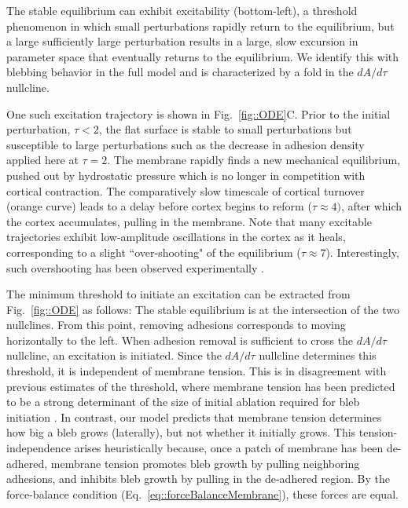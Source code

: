 The stable equilibrium can exhibit excitability (bottom-left), a threshold phenomenon in which small perturbations rapidly return to the equilibrium, but a large sufficiently large perturbation results in a large, slow excursion in parameter space that eventually returns to the equilibrium. We identify this with blebbing behavior in the full model and is characterized by a fold in the $dA/d\tau$ nullcline. 

One such excitation trajectory is shown in Fig.~\ref{fig::ODE}C. 
Prior to the initial perturbation, $\tau<2$, the flat surface is stable to small perturbations but susceptible to large perturbations such as the decrease in adhesion density applied here at $\tau=2$. The membrane rapidly finds a new mechanical equilibrium, pushed out by hydrostatic pressure which is no longer in competition with cortical contraction. The comparatively slow timescale of cortical turnover (orange curve) leads to a delay before cortex begins to reform ($\tau\approx 4)$, after which the cortex accumulates, pulling in the membrane. Note that many excitable trajectories exhibit low-amplitude oscillations in the cortex as it heals, corresponding to a slight ``over-shooting" of the equilibrium ($\tau\approx 7$). Interestingly, such overshooting has been observed experimentally \cite{Clark:2013ef}.

The minimum threshold to initiate an excitation can be extracted from Fig.~\ref{fig::ODE} as follows: The stable equilibrium is at the intersection of the two nullclines. From this point, removing adhesions corresponds to moving horizontally to the left. When adhesion removal is sufficient to cross the $dA/d\tau$ nullcline, an excitation is initiated. Since the $dA/d\tau$ nullcline determines this threshold, it is independent of membrane tension. This is in disagreement with previous estimates of the threshold, where membrane tension has been predicted to be a strong determinant of the size of initial ablation required for bleb initiation \cite{Charras:2008bz}. In contrast, our model predicts that membrane tension determines how big a bleb grows (laterally), but not whether it initially grows. This tension-independence arises heuristically because, once a patch of membrane has been de-adhered, membrane tension promotes bleb growth by pulling neighboring adhesions, and inhibits bleb growth by pulling in the de-adhered region. By the force-balance condition (Eq.~\ref{eq::forceBalanceMembrane}), these forces are equal.

